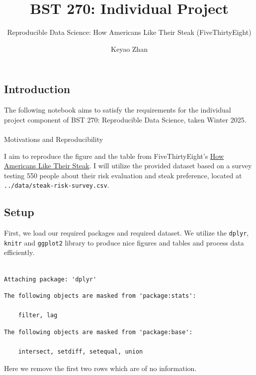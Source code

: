 \documentclass[
  letterpaper,
  DIV=11,
  numbers=noendperiod]{scrartcl}
\title{BST 270: Individual Project}
\subtitle{Reproducible Data Science: How Americans Like Their Steak
(FiveThirtyEight)}
\author{Keyao Zhan}
\date{}
\makeatletter
\let\oldparagraph\paragraph
\renewcommand{\paragraph}{
    \@ifstar
      \xxxParagraphStar
      \xxxParagraphNoStar
  }
\newcommand{\xxxParagraphStar}[1]{\oldparagraph*{#1}\mbox{}}
\newcommand{\xxxParagraphNoStar}[1]{\oldparagraph{#1}\mbox{}}
\makeatother
\begin{document}
\maketitle


\subsection{Introduction}\label{introduction}

The following notebook aims to satisfy the requirements for the
individual project component of BST 270: Reproducible Data Science,
taken Winter 2025.

\paragraph{Motivations and
Reproducibility}\label{motivations-and-reproducibility}

I aim to reproduce the figure and the table from FiveThirtyEight's
\href{https://fivethirtyeight.com/features/how-americans-like-their-steak/}{How
Americans Like Their Steak}. I will utilize the provided dataset based
on a survey testing 550 people about their risk evaluation and steak
preference, located at \texttt{../data/steak-risk-survey.csv}.

\subsection{Setup}\label{setup}

First, we load our required packages and required dataset. We utilize
the \texttt{dplyr}, \texttt{knitr} and \texttt{ggplot2} library to
produce nice figures and tables and process data efficiently.

\begin{verbatim}

Attaching package: 'dplyr'
\end{verbatim}

\begin{verbatim}
The following objects are masked from 'package:stats':

    filter, lag
\end{verbatim}

\begin{verbatim}
The following objects are masked from 'package:base':

    intersect, setdiff, setequal, union
\end{verbatim}

Here we remove the first two rows which are of no information.
\end{document}
